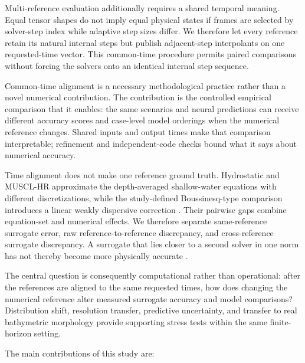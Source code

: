 Multi-reference evaluation additionally requires a shared temporal meaning. Equal tensor shapes do not imply equal physical states if frames are selected by solver-step index while adaptive step sizes differ. We therefore let every reference retain its natural internal steps but publish adjacent-step interpolants on one requested-time vector. This common-time procedure permits paired comparisons without forcing the solvers onto an identical internal step sequence.

Common-time alignment is a necessary methodological practice rather than a novel numerical contribution. The contribution is the controlled empirical comparison that it enables: the same scenarios and neural predictions can receive different accuracy scores and case-level model orderings when the numerical reference changes. Shared inputs and output times make that comparison interpretable; refinement and independent-code checks bound what it says about numerical accuracy.

Time alignment does not make one reference ground truth. Hydrostatic and MUSCL-HR approximate the depth-averaged shallow-water equations with different discretizations, while the study-defined Boussinesq-type comparison introduces a linear weakly dispersive correction \citep{audusse2004hydrostatic,clain2016secondorder,shi2012boussinesq}. Their pairwise gaps combine equation-set and numerical effects. We therefore separate same-reference surrogate error, raw reference-to-reference discrepancy, and cross-reference surrogate discrepancy. A surrogate that lies closer to a second solver in one norm has not thereby become more physically accurate \citep{koehler2026emulator}.

The central question is consequently computational rather than operational: after the references are aligned to the same requested times, how does changing the numerical reference alter measured surrogate accuracy and model comparisons? Distribution shift, resolution transfer, predictive uncertainty, and transfer to real bathymetric morphology provide supporting stress tests within the same finite-horizon setting.

\noindent
The main contributions of this study are:

